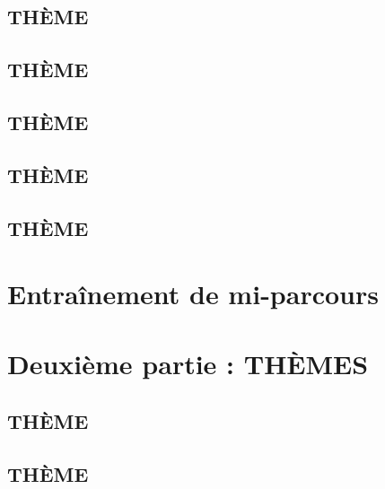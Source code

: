 \documentclass[poly,trombi]{valbonne}
\begin{document}

\subsection{THÈME}


\subsection{THÈME}


\subsection{THÈME}


\subsection{THÈME}


\subsection{THÈME}






\section{Entraînement de mi-parcours}








\section{Deuxième partie : THÈMES}

\subsection{THÈME}


\subsection{THÈME}
\end{document}
